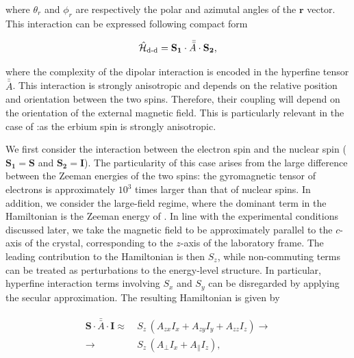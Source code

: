 \noindent where $\theta_r$ and $\phi_r$ are respectively the polar and azimutal angles of the $\mathbf{r}$ vector. This interaction can be expressed following compact form

\begin{equation}
    \hat{\mathcal{H}}_{\text{d-d}} = \mathbf{S_1} \cdot \bar{\bar {A}} \cdot \mathbf{S_2},
\end{equation}

\noindent where the complexity of the dipolar interaction is encoded in the hyperfine tensor $\bar{\bar{A}}$. This interaction is strongly anisotropic and depends on the relative position and orientation between the two spins. Therefore, their coupling will depend on the orientation of the external magnetic field. This is particularly relevant in the case of \Er:\Ca as the erbium spin is strongly anisotropic. 

We first consider the interaction between the \Er electron spin and the \W nuclear spin ($\mathbf{S_1}=\mathbf{S}$ and $\mathbf{S_2}=\mathbf{I}$). The particularity of this case arises from the large difference between the Zeeman energies of the two spins: the gyromagnetic tensor of electrons is approximately $10^3$ times larger than that of nuclear spins. In addition, we consider the large-field regime, where the dominant term in the Hamiltonian is the Zeeman energy of \Er. In line with the experimental conditions discussed later, we take the magnetic field to be approximately parallel to the $c$-axis of the crystal, corresponding to the $z$-axis of the laboratory frame. The leading contribution to the Hamiltonian is then $S_z$, while non-commuting terms can be treated as perturbations to the energy-level structure. In particular, hyperfine interaction terms involving $S_x$ and $S_y$ can be disregarded by applying the secular approximation. The resulting Hamiltonian is given by

\begin{align}
\begin{split}
    \mathbf{S}\cdot\bar{\bar{A}}\cdot\mathbf{I} \approx&\ S_z\,\left(A_{zx}I_x+A_{zy}I_y+A_{zz}I_z\right) \rightarrow \\
    \rightarrow &\ S_z \, \left(A_\perp I_x + A_\parallel I_z\right),
\end{split}
\end{align}

